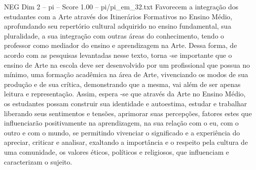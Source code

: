 \begin{textsample}{NEG Dim 2 – pi – Score 1.00 – pi/pi\_em\_32.txt}
Favorecem a integração dos estudantes com a Arte através dos Itinerários Formativos no Ensino Médio, aprofundando seu repertório cultural adquirido no ensino fundamental, sua pluralidade, a sua integração com outras áreas do conhecimento, tendo o professor como mediador do ensino e aprendizagem na Arte.
Dessa forma, de acordo com as pesquisas levantadas nesse texto, torna -se importante que o ensino de Arte na escola deve ser desenvolvido por um profissional que possua no mínimo, uma formação acadêmica na área de Arte, vivenciando os modos de sua produção e de sua crítica, demonstrando que a mesma, vai além de ser apenas leitura e representação.
Assim, espera -se que através da Arte no Ensino Médio, os estudantes possam construir sua identidade e autoestima, estudar e trabalhar liberando seus sentimentos e tensões, aprimorar suas percepções, fatores estes que influenciarão positivamente na aprendizagem, na sua relação com o eu, com o outro e com o mundo, se permitindo vivenciar o significado e a experiência do apreciar, criticar e analisar, exaltando a importância e o respeito pela cultura de uma comunidade, os valores éticos, políticos e religiosos, que influenciam e caracterizam o sujeito.

\end{textsample}
